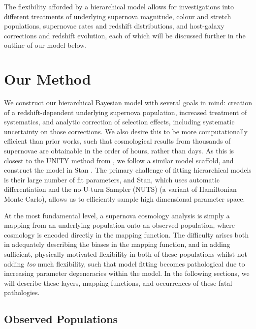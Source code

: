 \documentclass[a4paper,fleqn,usenatbib]{mnras}
\newcommand{\rubin}{\citetalias{Rubin2015}}
\begin{document}
The flexibility afforded by a hierarchical model allows for investigations into different treatments of underlying supernova magnitude, colour and stretch populations, supernovae rates and redshift distributions, and host-galaxy corrections and redshift evolution, each of which will be discussed further in the outline of our model below. 









\section{Our Method}
\label{sec:method}

We construct our hierarchical Bayesian model with several goals in mind: creation of a redshift-dependent underlying supernova population, increased treatment of systematics, and analytic correction of selection effects, including systematic uncertainty on those corrections. We also desire this to be more computationally efficient than prior works, such that cosmological results from thousands of supernovae are obtainable in the order of hours, rather than days. As this is closest to the UNITY method from \citet[][hereafter denoted \rubin]{Rubin2015}, we follow a similar model scaffold, and construct the model in Stan \citep{Carpenter2017, StanDevelopmentTeam2017}. The primary challenge of fitting hierarchical models is their large number of fit parameters, and Stan, which uses automatic differentiation and the no-U-turn Sampler (NUTS) (a variant of Hamiltonian Monte Carlo), allows us to efficiently sample high dimensional parameter space.

At the most fundamental level, a supernova cosmology analysis is simply a mapping from an underlying population onto an observed population, where cosmology is encoded directly in the mapping function. The difficulty arises both in adequately describing the biases in the mapping function, and in adding sufficient, physically motivated flexibility in both of these populations whilst not adding \textit{too} much flexibility, such that model fitting becomes pathological due to increasing parameter degeneracies within the model. In the following sections, we will describe these layers, mapping functions, and occurrences of these fatal pathologies.


\subsection{Observed Populations}
\end{document}
